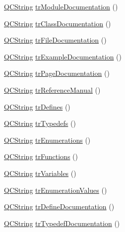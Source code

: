 \begin{DoxyCompactItemize}
\item 
\hyperlink{class_q_c_string}{Q\+C\+String} \hyperlink{class_translator_dutch_a312b01cc139e983239b80843510e187c}{tr\+Module\+Documentation} ()
\item 
\hyperlink{class_q_c_string}{Q\+C\+String} \hyperlink{class_translator_dutch_a14102bf3f1aefe2c39740eb3637f60e0}{tr\+Class\+Documentation} ()
\item 
\hyperlink{class_q_c_string}{Q\+C\+String} \hyperlink{class_translator_dutch_a87b333e866355d32f10f793db820709a}{tr\+File\+Documentation} ()
\item 
\hyperlink{class_q_c_string}{Q\+C\+String} \hyperlink{class_translator_dutch_a2b52d77053c21e63ec525a975e3857f0}{tr\+Example\+Documentation} ()
\item 
\hyperlink{class_q_c_string}{Q\+C\+String} \hyperlink{class_translator_dutch_a0839273a7a4c331fba0280257f1025f0}{tr\+Page\+Documentation} ()
\item 
\hyperlink{class_q_c_string}{Q\+C\+String} \hyperlink{class_translator_dutch_a1fe65007d1ec6adf7318662b00f7b272}{tr\+Reference\+Manual} ()
\item 
\hyperlink{class_q_c_string}{Q\+C\+String} \hyperlink{class_translator_dutch_ab3ae3d3eefbe7afb5c5ae837490ea642}{tr\+Defines} ()
\item 
\hyperlink{class_q_c_string}{Q\+C\+String} \hyperlink{class_translator_dutch_acf776d871a9987869aff1da7ebbfb5bf}{tr\+Typedefs} ()
\item 
\hyperlink{class_q_c_string}{Q\+C\+String} \hyperlink{class_translator_dutch_aea52ba9ad3771016059f87f93ca0b10d}{tr\+Enumerations} ()
\item 
\hyperlink{class_q_c_string}{Q\+C\+String} \hyperlink{class_translator_dutch_ad87b73d1e1ab77c99a5b81dcd450b0bf}{tr\+Functions} ()
\item 
\hyperlink{class_q_c_string}{Q\+C\+String} \hyperlink{class_translator_dutch_a31ecd777b6fdf83ea149ff7e39e97288}{tr\+Variables} ()
\item 
\hyperlink{class_q_c_string}{Q\+C\+String} \hyperlink{class_translator_dutch_a7dd69efc9bae2ff3ce444d8ee19f8962}{tr\+Enumeration\+Values} ()
\item 
\hyperlink{class_q_c_string}{Q\+C\+String} \hyperlink{class_translator_dutch_a4719fb4200f860fc77b14c3cf065c0fa}{tr\+Define\+Documentation} ()
\item 
\hyperlink{class_q_c_string}{Q\+C\+String} \hyperlink{class_translator_dutch_a9cf1cb71cffee34e993a4afb3d7a5baf}{tr\+Typedef\+Documentation} ()
\item 

\end{DoxyCompactItemize}
